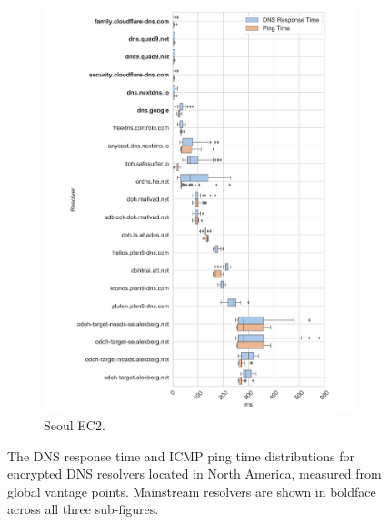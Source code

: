 \begin{figure}[h!]
\begin{subfigure}[b]{0.35\textwidth}
\includegraphics[width=\textwidth]{figures/seoul_NA.pdf}
\caption{Seoul EC2.}
\end{subfigure}
\caption{The DNS response time and ICMP ping time distributions for
    encrypted DNS resolvers located in North America, measured from global vantage points.
    Mainstream resolvers are shown in boldface across all three
    sub-figures.}
\label{fig:dns-NA}
\end{figure}

